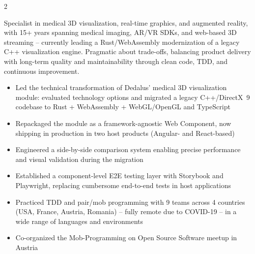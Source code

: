 \documentclass[10pt,a4paper,withhyper]{altacv}
\begin{document}


\makecvheader


\begin{paracol}{2}

Specialist in medical 3D visualization, real-time graphics, and augmented reality, with 15+ years spanning medical imaging, AR/VR SDKs, and web-based 3D streaming -- currently leading a Rust/WebAssembly modernization of a legacy C++ visualization engine. Pragmatic about trade-offs, balancing product delivery with long-term quality and maintainability through clean code, TDD, and continuous improvement.


\begin{itemize}
\item Led the technical transformation of Dedalus' medical 3D visualization module: evaluated technology options and migrated a legacy C++/DirectX~9 codebase to Rust + WebAssembly + WebGL/OpenGL and TypeScript
\item Repackaged the module as a framework-agnostic Web Component, now shipping in production in two host products (Angular- and React-based)
\item Engineered a side-by-side comparison system enabling precise performance and visual validation during the migration
\item Established a component-level E2E testing layer with Storybook and Playwright, replacing cumbersome end-to-end tests in host applications
\end{itemize}

\divider

\begin{itemize}
\item Practiced TDD and pair/mob programming with 9 teams across 4 countries (USA, France, Austria, Romania) -- fully remote due to COVID-19 -- in a wide range of languages and environments
\item Co-organized the Mob-Programming on Open Source Software meetup in Austria
\end{itemize}


\end{paracol}
\end{document}
